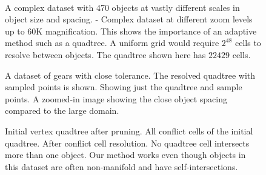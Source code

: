 \documentclass[final,3p,times,twocolumn]{elsarticle}
\begin{document}
\begin{figure}
  \centering
   \\
  \caption{
    \protect{} A complex dataset with 470 objects at vastly different scales in object size and spacing.
    \protect{}-\protect{} Complex dataset at different zoom levels up to 60K magnification. This shows the importance of an adaptive method such as a quadtree. A uniform grid would require $2^{48}$ cells to resolve between objects. The quadtree shown here has $22429$ cells.
  }
  \label{fig:results-maze}
\end{figure}


\begin{figure}
  \centering
  \caption{
    \protect{} A dataset of gears with close tolerance. The resolved quadtree with sampled points is shown.
    \protect{} Showing just the quadtree and sample points.
    \protect{} A zoomed-in image showing the close object spacing compared to the large domain.
  }
  \label{fig:gears}
\end{figure}

\begin{figure}
  \centering
  \subfloat[][]{
    \label{fig:vascular-3}
    \texttt{[image: Nathan/vascular-bundles/14-Resolved-Quadtree.PNG]} }
  \caption{
    \protect{} Initial vertex quadtree after pruning.
    \protect{} All conflict cells of the initial quadtree.
    \protect{} After conflict cell resolution. No quadtree cell intersects more than one object. Our method works even though objects in this dataset are often non-manifold and have self-intersections.
  }
  \label{fig:vascular}
\end{figure}
\end{document}
